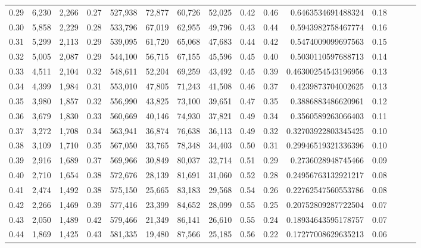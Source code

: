 \begin{tabular}{rrrrrrrrrrrrrrr}
0.29 &   6,230 &  2,266 &  0.27 &  527,938 &   72,877 &   60,726 &   52,025 &  0.42 &  0.46 &      0.6463534691488324 &      0.18 \\
0.30 &   5,858 &  2,229 &  0.28 &  533,796 &   67,019 &   62,955 &   49,796 &  0.43 &  0.44 &      0.5943982758467774 &      0.16 \\
0.31 &   5,299 &  2,113 &  0.29 &  539,095 &   61,720 &   65,068 &   47,683 &  0.44 &  0.42 &      0.5474009099697563 &      0.15 \\
0.32 &   5,005 &  2,087 &  0.29 &  544,100 &   56,715 &   67,155 &   45,596 &  0.45 &  0.40 &      0.5030110597688713 &      0.14 \\
0.33 &   4,511 &  2,104 &  0.32 &  548,611 &   52,204 &   69,259 &   43,492 &  0.45 &  0.39 &     0.46300254543196956 &      0.13 \\
0.34 &   4,399 &  1,984 &  0.31 &  553,010 &   47,805 &   71,243 &   41,508 &  0.46 &  0.37 &      0.4239873704002625 &      0.13 \\
0.35 &   3,980 &  1,857 &  0.32 &  556,990 &   43,825 &   73,100 &   39,651 &  0.47 &  0.35 &      0.3886883486620961 &      0.12 \\
0.36 &   3,679 &  1,830 &  0.33 &  560,669 &   40,146 &   74,930 &   37,821 &  0.49 &  0.34 &      0.3560589263066403 &      0.11 \\
0.37 &   3,272 &  1,708 &  0.34 &  563,941 &   36,874 &   76,638 &   36,113 &  0.49 &  0.32 &     0.32703922803345425 &      0.10 \\
0.38 &   3,109 &  1,710 &  0.35 &  567,050 &   33,765 &   78,348 &   34,403 &  0.50 &  0.31 &     0.29946519321336396 &      0.10 \\
0.39 &   2,916 &  1,689 &  0.37 &  569,966 &   30,849 &   80,037 &   32,714 &  0.51 &  0.29 &      0.2736028948745466 &      0.09 \\
0.40 &   2,710 &  1,654 &  0.38 &  572,676 &   28,139 &   81,691 &   31,060 &  0.52 &  0.28 &     0.24956763132921217 &      0.08 \\
0.41 &   2,474 &  1,492 &  0.38 &  575,150 &   25,665 &   83,183 &   29,568 &  0.54 &  0.26 &     0.22762547560553786 &      0.08 \\
0.42 &   2,266 &  1,469 &  0.39 &  577,416 &   23,399 &   84,652 &   28,099 &  0.55 &  0.25 &     0.20752809287722504 &      0.07 \\
0.43 &   2,050 &  1,489 &  0.42 &  579,466 &   21,349 &   86,141 &   26,610 &  0.55 &  0.24 &     0.18934643595178757 &      0.07 \\
0.44 &   1,869 &  1,425 &  0.43 &  581,335 &   19,480 &   87,566 &   25,185 &  0.56 &  0.22 &     0.17277008629635213 &      0.06 \\

\end{tabular}
